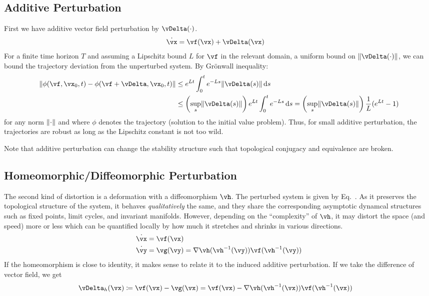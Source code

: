 \documentclass[a4paper,twoside]{article}
\renewcommand{\eqref}{Eq.~\originaleqref}
\newcounter{ct}
\DeclarePairedDelimiter{\norm}{\lVert}{\rVert}
\newcommand{\inv}{^{-1}}
\newcommand{\homeo}{\vh}
\newcommand{\invhomeo}{\homeo\inv}
\begin{document}
\subsection{Additive Perturbation}
First we have additive vector field perturbation by $\vDelta(\cdot)$.
\begin{align}
    \dot{\vx} &= \vf(\vx) + \vDelta(\vx)
\end{align}
For a finite time horizon $T$ and assuming a Lipschitz bound $L$ for $\vf$ in the relevant domain, a uniform bound on $\norm{\vDelta(\cdot)}$, we can bound the trajectory deviation from the unperturbed system.
By Gr\"onwall inequality\cite{Howard2025}:
\begin{align}
    \norm{
	\phi(\vf, \vx_0, t)
	-
	\phi(\vf + \vDelta, \vx_0, t)
    }
    &\leq
	e^{Lt} \int_0^t e^{-Ls} \norm{\vDelta(s)} \,\mathrm{d}s
\\
    &\leq
	\left(\sup_s \norm{\vDelta(s)}\right) e^{Lt} \int_0^t e^{-Ls} \,\mathrm{d}s
    =
	\left(\sup_s \norm{\vDelta(s)}\right) \frac{1}{L} (e^{Lt} - 1)
\end{align}
for any norm $\norm{\cdot}$ and where $\phi$ denotes the trajectory (solution to the initial value problem).
Thus, for small additive perturbation, the trajectories are robust as long as the Lipschitz constant is not too wild.

Note that additive perturbation can change the stability structure such that topological conjugacy and equivalence are broken.

\subsection{Homeomorphic/Diffeomorphic Perturbation}
The second kind of distortion is a deformation with a diffeomorphism $\homeo$.
The perturbed system is given by \eqref{eq:distortion:homeo}.
As it preserves the topological structure of the system, it behaves \emph{qualitatively} the same, and they share the corresponding asymptotic dynamcal structures such as fixed points, limit cycles, and invariant manifolds.
However, depending on the ``complexity'' of $\homeo$, it may distort the space (and speed) more or less which can be quantified locally by how much it stretches and shrinks in various directions.
\begin{align}
    \dot{\vx} &= \vf(\vx)
    \\
    \dot{\vy} &= \vg(\vy)
	= \nabla\homeo(\invhomeo(\vy)) \vf(\invhomeo(\vy))
\end{align}
If the homeomorphism is close to identity, it makes sense to relate it to the induced additive perturbation.
If we take the difference of vector field, we get
\begin{align}
    \vDelta_h(\vx) &\coloneqq \vf(\vx) - \vg(\vx) =
	\vf(\vx) -
	\nabla\homeo(\invhomeo(\vx)) \vf(\invhomeo(\vx))
\end{align}
\end{document}
